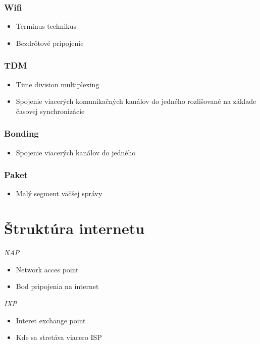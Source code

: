 \documentclass[10pt,xcolor=pdflatex,hyperref={unicode}]{beamer}
\begin{document}
    \begin{frame}
        \frametitle{Wifi}
        \begin{itemize}
            \item Terminus technikus
            \item Bezdrôtové pripojenie
        \end{itemize}
    \end{frame}

    \begin{frame}
        \frametitle{TDM}
        \begin{itemize}
            \item Time division multiplexing
            \item Spojenie viacerých komunikačných kanálov do jedného rozlišované na základe časovej synchronizácie
        \end{itemize}
    \end{frame}

    \begin{frame}
        \frametitle{Bonding}
        \begin{itemize}
            \item Spojenie viacerých kanálov do jedného
        \end{itemize}
    \end{frame}

    \begin{frame}
        \frametitle{Paket}
        \begin{itemize}
            \item Malý segment väčšej správy
        \end{itemize}
    \end{frame}


    \section{Štruktúra internetu}
    \begin{frame}
        \emph{NAP}
        \begin{itemize}
            \item Network acces point
            \item Bod pripojenia na internet
        \end{itemize}
        \emph{IXP}
        \begin{itemize}
            \item Interet exchange point
            \item Kde sa stretáva viacero ISP
        \end{itemize}
    \end{frame}
\end{document}
